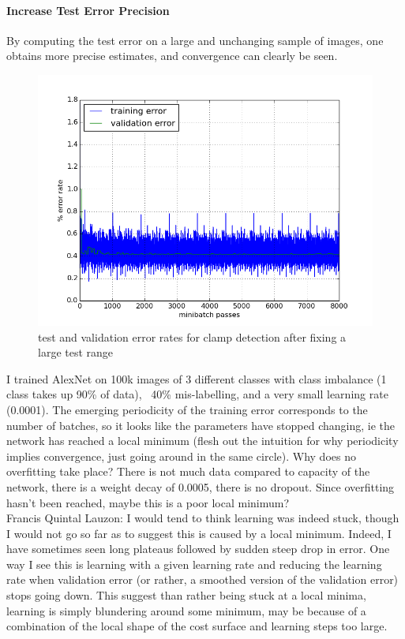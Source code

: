 \documentclass[a4paper,11pt]{article}
\begin{document}
\paragraph{Increase Test Error Precision}

By computing the test error on a large and unchanging sample of images, one obtains more precise estimates, and convergence can clearly be seen.

\begin{figure}[h!]
	\centering
	\includegraphics[scale=0.5]{images/increase_test_precision.png}
	\caption{test and validation error rates for clamp detection after fixing a large test range}
\end{figure}

I trained AlexNet on 100k images of 3 different classes with class imbalance (1 class takes up 90\% of data), ~40\% mis-labelling, and a very small learning rate (0.0001). The emerging periodicity of the training error corresponds to the number of batches, so it looks like the parameters have stopped changing, ie the network has reached a local minimum (flesh out the intuition for why periodicity implies convergence, just going around in the same circle). Why does no overfitting take place? There is not much data compared to capacity of the network, there is a weight decay of 0.0005,  there is no dropout. Since overfitting hasn't been reached, maybe this is a poor local minimum?﻿\\

Francis Quintal Lauzon: I would tend to think learning was indeed stuck, though I would not go so far as to suggest this is caused by a local minimum.
Indeed, I have sometimes seen long plateaus followed by sudden steep drop in error.  One way I see this is learning with a given learning rate and reducing the learning rate when validation error (or rather, a smoothed version of the validation error) stops going down.  This suggest than rather being stuck at a local minima, learning is simply blundering around some minimum, may be because of a combination of the local shape of the cost surface and learning steps too large. \\
\end{document}
